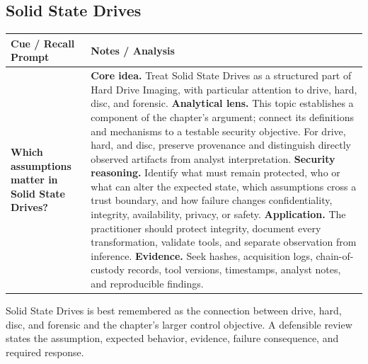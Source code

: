\documentclass[11pt]{article}
\newcommand{\CornellHeader}{%
\rowcolor{Navy}\color{white}\bfseries Cue / Recall Prompt & \color{white}\bfseries Notes / Analysis\\\hline}
\newcommand{\CornellRow}[2]{%
\cellcolor{CueGray}\RaggedRight\textbf{#1} & \RaggedRight #2\\\hline}
\begin{document}
\subsection*{Solid State Drives}
\begin{longtable}{>{\RaggedRight\arraybackslash}p{}|>{\RaggedRight\arraybackslash}p{}}
\CornellHeader
\CornellRow{Which assumptions matter in Solid State Drives?}{\textbf{Core idea.} Treat Solid State Drives as a structured part of Hard Drive Imaging, with particular attention to drive, hard, disc, and forensic. \textbf{Analytical lens.} This topic establishes a component of the chapter's argument; connect its definitions and mechanisms to a testable security objective. For drive, hard, and disc, preserve provenance and distinguish directly observed artifacts from analyst interpretation. \textbf{Security reasoning.} Identify what must remain protected, who or what can alter the expected state, which assumptions cross a trust boundary, and how failure changes confidentiality, integrity, availability, privacy, or safety. \textbf{Application.} The practitioner should protect integrity, document every transformation, validate tools, and separate observation from inference. \textbf{Evidence.} Seek hashes, acquisition logs, chain-of-custody records, tool versions, timestamps, analyst notes, and reproducible findings.}
\end{longtable}
\begin{topicsummary}
Solid State Drives is best remembered as the connection between drive, hard, disc, and forensic and the chapter's larger control objective. A defensible review states the assumption, expected behavior, evidence, failure consequence, and required response.
\end{topicsummary}
\end{document}
